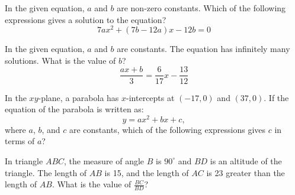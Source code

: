 \noindent\markforreview
\vspace{1em}

In the given equation, \(a\) and \(b\) are non-zero constants.
Which of the following expressions gives a solution to the equation?
\[
7ax^2 + (7b - 12a)x - 12b = 0
\]

\vspace{0.75em}


\vspace{2em}
\newpage

\noindent\markforreview
\vspace{1em}

In the given equation, \(a\) and \(b\) are constants.
The equation has infinitely many solutions.
What is the value of \(b\)?
\[
\frac{ax + b}{3} = \frac{6}{17}x - \frac{13}{12}
\]

\vspace{0.75em}


\vspace{2em}
\newpage

\noindent\markforreview
\vspace{1em}

In the \(xy\)-plane, a parabola has \(x\)-intercepts at \((-17, 0)\) and \((37, 0)\).
If the equation of the parabola is written as:
\[
y = ax^2 + bx + c,
\]
where \(a\), \(b\), and \(c\) are constants,
which of the following expressions gives \(c\) in terms of \(a\)?

\vspace{0.75em}


\vspace{2em}
\newpage

\noindent\markforreview
\vspace{1em}

In triangle \(ABC\), the measure of angle \(B\) is \(90^\circ\) and \(BD\) is an altitude of the triangle.
The length of \(AB\) is 15, and the length of \(AC\) is 23 greater than the length of \(AB\).
What is the value of \(\frac{BC}{BD}\)?

\vspace{0.75em}

